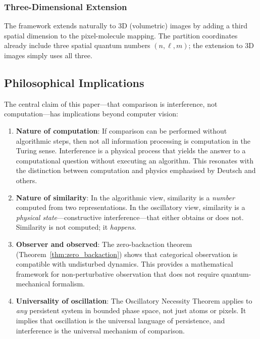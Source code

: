 \documentclass[11pt,twocolumn,a4paper]{article}
\begin{document}
\subsubsection{Three-Dimensional Extension}
The framework extends naturally to 3D (volumetric) images by adding a third spatial dimension to the pixel-molecule mapping. The partition coordinates already include three spatial quantum numbers $(n, \ell, m)$; the extension to 3D images simply uses all three.

\subsection{Philosophical Implications}

The central claim of this paper---that comparison is interference, not computation---has implications beyond computer vision:

\begin{enumerate}[label=(\roman*)]
    \item \textbf{Nature of computation}: If comparison can be performed without algorithmic steps, then not all information processing is computation in the Turing sense. Interference is a physical process that yields the answer to a computational question without executing an algorithm. This resonates with the distinction between computation and physics emphasised by Deutsch and others.

    \item \textbf{Nature of similarity}: In the algorithmic view, similarity is a \emph{number} computed from two representations. In the oscillatory view, similarity is a \emph{physical state}---constructive interference---that either obtains or does not. Similarity is not computed; it \emph{happens}.

    \item \textbf{Observer and observed}: The zero-backaction theorem (Theorem~\ref{thm:zero_backaction}) shows that categorical observation is compatible with undisturbed dynamics. This provides a mathematical framework for non-perturbative observation that does not require quantum-mechanical formalism.

    \item \textbf{Universality of oscillation}: The Oscillatory Necessity Theorem applies to \emph{any} persistent system in bounded phase space, not just atoms or pixels. It implies that oscillation is the universal language of persistence, and interference is the universal mechanism of comparison.
\end{enumerate}
\end{document}
